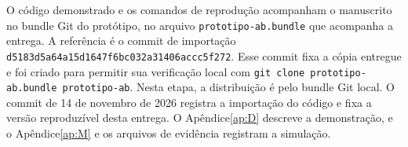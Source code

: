 O código demonstrado e os comandos de reprodução acompanham o manuscrito no bundle Git do protótipo, no arquivo \texttt{prototipo-\allowbreak{}ab.\allowbreak{}bundle} que acompanha a entrega. A referência é o commit de importação \texttt{d5183d5a64a1\allowbreak{}5d1647f6bc03\allowbreak{}2a31406accc5\allowbreak{}f272}. Esse commit fixa a cópia entregue e foi criado para permitir sua verificação local com \texttt{git clone pr\allowbreak{}ototipo-\allowbreak{}ab.\allowbreak{}bundle proto\allowbreak{}tipo-\allowbreak{}ab}. Nesta etapa, a distribuição é pelo bundle Git local. O commit de 14 de novembro de 2026 registra a importação do código e fixa a versão reproduzível desta entrega. O Apêndice\nobreakspace{}\ref{ap:D} descreve a demonstração, e o Apêndice\nobreakspace{}\ref{ap:M} e os arquivos de evidência registram a simulação.
